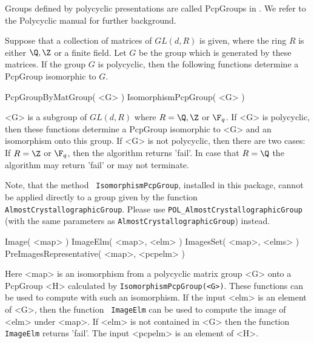 
\label{section_present}
 
Groups defined by polycyclic presentations are called PcpGroups in
{\GAP}.
We refer to the Polycyclic manual \cite{polycyclic} for further
background.

Suppose that a collection of
matrices of $GL(d,R)$ is given, where the ring $R$ 
is either $\Q,\Z$ or a finite field.  Let $G$ be the group which is
generated by these matrices. If the group $G$ is polycyclic, then the
following functions determine a PcpGroup isomorphic to $G$.
 
\> PcpGroupByMatGroup( <G> )
\> IsomorphismPcpGroup( <G> )
 
<G> is  a subgroup of $GL(d,R)$ where $R=\Q,\Z $ or $\F_q$.
If <G> is polycyclic, then 
these functions determine a PcpGroup isomorphic to <G> and an isomorphism
onto this group. 
If <G> is not polycyclic, then there are two cases: If $R=\Z$ or $\F_q$,
then the algorithm returns 'fail'. In case that $R=\Q$ the algorithm may
return 'fail' or may not terminate. 

Note, that the method {\tt
IsomorphismPcpGroup}, installed in this package, cannot be
applied directly to a group given by the function {\tt AlmostCrystallographicGroup}.
Please use  {\tt POL_AlmostCrystallographicGroup} (with the same
parameters as {\tt AlmostCrystallographicGroup}) instead. 

\> Image( <map> ) 
\> ImageElm( <map>, <elm> )
\> ImagesSet( <map>, <elms> )
\> PreImagesRepresentative( <map>, <pcpelm> )
 
Here <map> is an isomorphism from a polycyclic matrix group <G>
onto a PcpGroup <H> calculated
by {\tt IsomorphismPcpGroup(<G>)}.
These functions can be used to compute with such an isomorphism. 
If the input <elm>  is an element of <G>, then the function {\tt
ImageElm} can be used to compute the image of <elm> under <map>. 
If <elm> is not contained in <G>
then the function {\tt ImageElm} returns 'fail'. 
The input <pcpelm> is an element
of <H>. 

